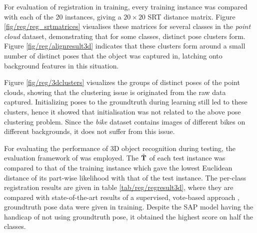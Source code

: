 For evaluation of registration in training, every training instance was compared with each of the 20 instances, giving a $20 \times 20$ SRT distance matrix. Figure \ref{fig/reg/reg_srtmatrices} visualises these matrices for several classes in the \emph{point cloud} dataset, demonstrating that for some classes, distinct pose clusters form. Figure \ref{fig/reg/alignresult3d} indicates that these clusters form around a small number of distinct poses that the object was captured in, latching onto background features in this situation. 

Figure \ref{fig/reg/3dclusters} visualizes the groups of distinct poses of the point clouds, showing that the clustering issue is originated from the raw data captured. Initializing poses to the groundtruth during learning still led to these clusters, hence it showed that initialisation was not related to the above pose clustering problem. Since the \emph{bike} dataset contains images of different bikes on different backgrounds, it does not suffer from this issue.

For evaluating the performance of 3D object recognition during testing, the evaluation framework of \cite{Pham2011} was employed. The $\tilde{\mathbf{T}}$ of each test instance was compared to that of the training instance which gave the lowest Euclidean distance of its part-wise likelihood with that of the test instance. The per-class registration results are given in table \ref{tab/reg/regresult3d}, where they are compared with state-of-the-art results of a supervised, vote-based approach \cite{Woodford2013}, \ie groundtruth pose data were given in training. Despite the SAP model having the handicap of not using groundtruth pose, it obtained the highest score on half the classes.


